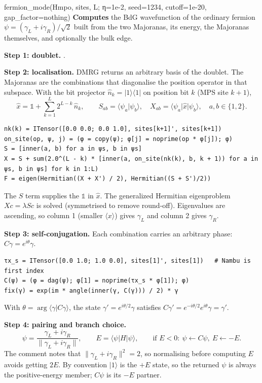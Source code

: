 \documentclass[11pt]{article}
\newcommand{\ket}[1]{\lvert #1\rangle}
\newcommand{\bra}[1]{\langle #1\rvert}
\begin{document}
\begin{function}{fermion\_mode(Hmpo, sites, L; η=1e-2, seed=1234, cutoff=1e-20, gap\_factor=nothing)}
\textbf{Computes} the BdG wavefunction of the ordinary fermion $\psi=(\gamma_L+i\gamma_R)/\sqrt2$ built from the two
Majoranas, its energy, the Majoranas themselves, and optionally the bulk edge.

\textbf{Step 1: doublet.} .

\textbf{Step 2: localisation.} DMRG returns an arbitrary basis of the doublet. The Majoranas are the combinations
that diagonalise the position operator in that subspace. With the bit projector $\hat n_k = \ket{1}\bra{1}$ on
position bit $k$ (MPS site $k+1$),
\[
  \hat x = \mathbb 1 + \sum_{k=1}^{L} 2^{L-k}\, \hat n_k ,
  \qquad
  S_{ab} = \langle\psi_a\vert\psi_b\rangle,\quad
  X_{ab} = \bra{\psi_a}\hat x\ket{\psi_b}, \quad a,b\in\{1,2\}.
\]
\begin{Verbatim}
nk(k) = ITensor([0.0 0.0; 0.0 1.0], sites[k+1]', sites[k+1])
on_site(op, ψ, j) = (φ = copy(ψ); φ[j] = noprime(op * φ[j]); φ)
S = [inner(a, b) for a in ψs, b in ψs]
X = S + sum(2.0^(L - k) * [inner(a, on_site(nk(k), b, k + 1)) for a in ψs, b in ψs] for k in 1:L)
F = eigen(Hermitian((X + X') / 2), Hermitian((S + S')/2))
\end{Verbatim}
The $S$ term supplies the $\mathbb 1$ in $\hat x$. The generalized Hermitian eigenproblem $Xc=\lambda Sc$ is solved
(symmetrised to remove round-off). Eigenvalues are ascending, so column 1 (smaller $\langle x\rangle$) gives
$\gamma_L$ and column 2 gives $\gamma_R$.

\textbf{Step 3: self-conjugation.} Each combination carries an arbitrary phase: $C\gamma = e^{i\theta}\gamma$.
\begin{Verbatim}
τx_s = ITensor([0.0 1.0; 1.0 0.0], sites[1]', sites[1])   # Nambu is first index
C(ψ) = (φ = dag(ψ); φ[1] = noprime(τx_s * φ[1]); φ)
fix(γ) = exp(im * angle(inner(γ, C(γ))) / 2) * γ
\end{Verbatim}
With $\theta=\arg\langle\gamma\vert C\gamma\rangle$, the state $\gamma'=e^{i\theta/2}\gamma$ satisfies
$C\gamma' = e^{-i\theta/2}e^{i\theta}\gamma = \gamma'$.

\textbf{Step 4: pairing and branch choice.}
\[
  \psi = \frac{\gamma_L + i\gamma_R}{\lVert\gamma_L + i\gamma_R\rVert},\qquad E=\bra{\psi}H\ket{\psi},\qquad
  \text{if } E<0:\ \psi\leftarrow C\psi,\ E\leftarrow -E .
\]
The comment notes that $\lVert\gamma_L+i\gamma_R\rVert^2=2$, so normalising before computing $E$ avoids getting $2E$.
By convention $\ket{1}$ is the $+E$ state, so the returned $\psi$ is always the positive-energy member; $C\psi$ is its
$-E$ partner.


\end{function}
\end{document}
